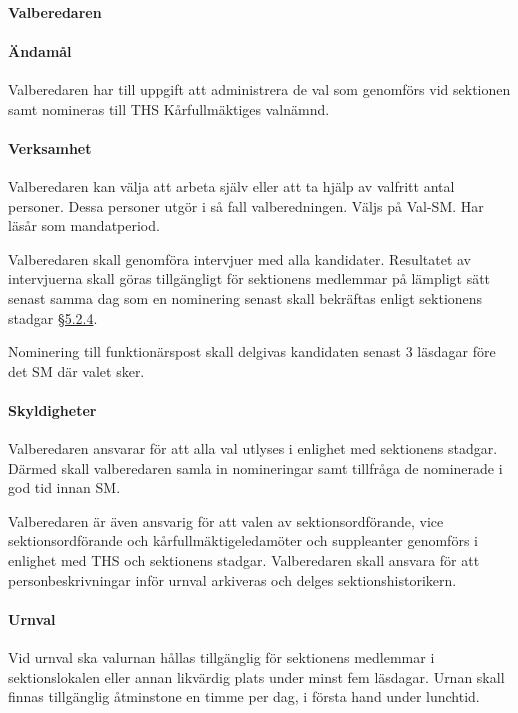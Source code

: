 \documentclass[a4paper,12pt]{article}
\begin{document}
\paragraph{Valberedaren}

\paragraph{Ändamål}

Valberedaren har till uppgift att administrera de val som genomförs vid sektionen samt nomineras till THS Kårfullmäktiges valnämnd.

\paragraph{Verksamhet}

Valberedaren kan välja att arbeta själv eller att ta hjälp av valfritt antal personer. Dessa personer utgör i så fall valberedningen. Väljs på Val-SM. Har läsår som mandatperiod.

Valberedaren skall genomföra intervjuer med alla kandidater. Resultatet av intervjuerna skall göras tillgängligt för sektionens medlemmar på lämpligt sätt senast samma dag som en nominering senast skall bekräftas enligt sektionens stadgar \href{/sektionen/formalia/stadgar#funktionarer}{§5.2.4}.

Nominering till funktionärspost skall delgivas kandidaten senast 3 läsdagar före det SM där valet sker.

\paragraph{Skyldigheter}

Valberedaren ansvarar för att alla val utlyses i enlighet med sektionens stadgar. Därmed skall valberedaren samla in nomineringar samt tillfråga de nominerade i god tid innan SM.

Valberedaren är även ansvarig för att valen av sektionsordförande, vice sektionsordförande och kårfullmäktigeledamöter och suppleanter genomförs i enlighet med THS och sektionens stadgar. Valberedaren skall ansvara för att personbeskrivningar inför urnval arkiveras och delges sektionshistorikern.

\paragraph{Urnval}

Vid urnval ska valurnan hållas tillgänglig för sektionens medlemmar i sektionslokalen eller annan likvärdig plats under minst fem läsdagar. Urnan skall finnas tillgänglig åtminstone en timme per dag, i första hand under lunchtid.
\end{document}
